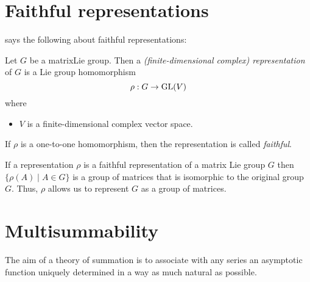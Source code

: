 \section{Faithful representations} \label{sec:faithRepre}
\cite[Def.4.1]{hall2003lie} says the following about faithful representations:
\begin{defn}
  \begin{comment}
    See:
    \begin{itemize}
      \item \cite[Def.4.1]{hall2003lie}
      \item \url{http://nlab.mathforge.org/nlab/show/faithful+representation}
    \end{itemize}
  \end{comment}
  Let $G$ be a matrix\TODO[??] Lie group. Then a \emph{(finite-dimensional
  complex) representation} of $G$ is a Lie group homomorphism
  \[
    \rho:G\to\operatorname{GL}(V)
  \]
  where
  \begin{itemize}
    \item $V$ is a finite-dimensional complex vector space.
  \end{itemize}
  If $\rho$ is a one-to-one homomorphism, then the representation is called
  \emph{faithful}.
  \begin{comment}
    \textbf{Other criterion:}
    If the associated homomorphism $G\to\Aut(V)$ is injective, then the
    representation is \emph{faithful}.
  \end{comment}
  \begin{s-rem}
    If a representation $\rho$ is a faithful representation of a matrix Lie
    group $G$ then $\{\rho(A)\mid A\in G\}$ is a group of matrices that is
    isomorphic to the original group $G$. Thus, $\rho$ allows us to represent
    $G$ as a group of matrices.
  \end{s-rem}
\end{defn}

\section{Multisummability}\label{sec:multisummability}
\begin{comment}
  \cite[Sec.III.2]{Loday2014},
  \cite[Chap.6]{Loday2014} and
  \cite[Chap.8]{Loday2014}
\end{comment}
The aim of a theory of summation is  to associate with any series an asymptotic
function uniquely determined in a way as much natural as possible.


